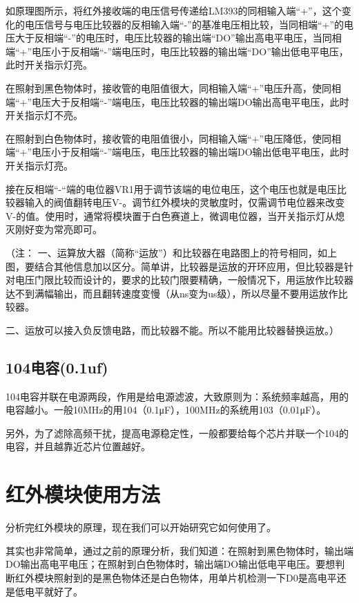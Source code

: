 如原理图所示，将红外接收端的电压信号传递给LM393的同相输入端“+”，这个变化的电压信号与电压比较器的反相输入端“-”的基准电压相比较，当同相端“+”的电压大于反相端“-”的电压时，电压比较器的输出端“DO”输出高电平电压，当同相端“+”电压小于反相端“-”端电压时，电压比较器的输出端“DO”输出低电平电压，此时开关指示灯亮。

在照射到黑色物体时，接收管的电阻值很大，同相输入端“+”电压升高，使同相端“+”电压大于反相端“-”端电压，电压比较器的输出端DO输出高电平电压，此时开关指示灯不亮。

在照射到白色物体时，接收管的电阻值很小，同相输入端“+”电压降低，使同相端“+”电压小于反相端“-”端电压，电压比较器的输出端DO输出低电平电压，此时开关指示灯亮。

接在反相端“-“端的电位器VR1用于调节该端的电位电压，这个电压也就是电压比较器输入的阀值翻转电压V-。调节红外模块的灵敏度时，仅需调节电位器来改变V-的值。使用时，通常将模块置于白色赛道上，微调电位器，当开关指示灯从熄灭刚好变为常亮即可。

（注：
一、运算放大器（简称“运放”）和比较器在电路图上的符号相同，如上图，要结合其他信息加以区分。简单讲，比较器是运放的开环应用，但比较器是针对电压门限比较而设计的，要求的比较门限要精确，一般情况下，用运放作比较器达不到满幅输出，而且翻转速度变慢（从ns变为us级），所以尽量不要用运放作比较器。

二、运放可以接入负反馈电路，而比较器不能。所以不能用比较器替换运放。）

\subsection{104电容(0.1uf)}
104电容并联在电源两段，作用是给电源滤波，大致原则为：系统频率越高，用的电容越小。一般10MHz的用104（0.1μF），100MHz的系统用103（0.01μF）。

另外，为了滤除高频干扰，提高电源稳定性，一般都要给每个芯片并联一个104的电容，并且越靠近芯片位置越好。

\section{红外模块使用方法}
分析完红外模块的原理，现在我们可以开始研究它如何使用了。

其实也非常简单，通过之前的原理分析，我们知道：在照射到黑色物体时，输出端DO输出高电平电压；在照射到白色物体时，输出端DO输出低电平电压。要想判断红外模块照射到的是黑色物体还是白色物体，用单片机检测一下D0是高电平还是低电平就好了。
